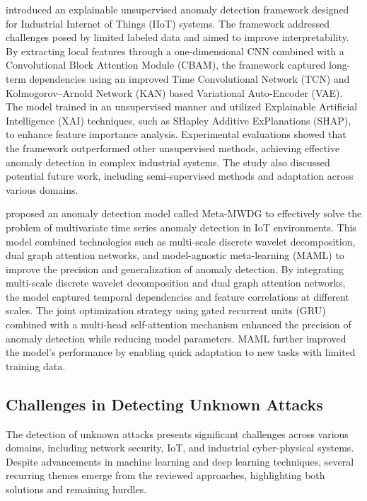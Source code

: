 \citet{abudurexiti2025explainable} introduced an explainable unsupervised anomaly detection framework designed for Industrial Internet of Things (IIoT) systems. The framework addressed challenges posed by limited labeled data and aimed to improve interpretability. By extracting local features through a one-dimensional CNN combined with a Convolutional Block Attention Module (CBAM), the framework captured long-term dependencies using an improved Time Convolutional Network (TCN) and Kolmogorov–Arnold Network (KAN) based Variational Auto-Encoder (VAE). The model trained in an unsupervised manner and utilized Explainable Artificial Intelligence (XAI) techniques, such as SHapley Additive ExPlanations (SHAP), to enhance feature importance analysis. Experimental evaluations showed that the framework outperformed other unsupervised methods, achieving effective anomaly detection in complex industrial systems. The study also discussed potential future work, including semi-supervised methods and adaptation across various domains.

\citet{xie2024anomaly} proposed an anomaly detection model called Meta-MWDG to effectively solve the problem of multivariate time series anomaly detection in IoT environments. This model combined technologies such as multi-scale discrete wavelet decomposition, dual graph attention networks, and model-agnostic meta-learning (MAML) to improve the precision and generalization of anomaly detection. By integrating multi-scale discrete wavelet decomposition and dual graph attention networks, the model captured temporal dependencies and feature correlations at different scales. The joint optimization strategy using gated recurrent units (GRU) combined with a multi-head self-attention mechanism enhanced the precision of anomaly detection while reducing model parameters. MAML further improved the model’s performance by enabling quick adaptation to new tasks with limited training data. 


\subsection{Challenges in Detecting Unknown Attacks}

The detection of unknown attacks presents significant challenges across various domains, including network security, IoT, and industrial cyber-physical systems. Despite advancements in machine learning and deep learning techniques, several recurring themes emerge from the reviewed approaches, highlighting both solutions and remaining hurdles.

